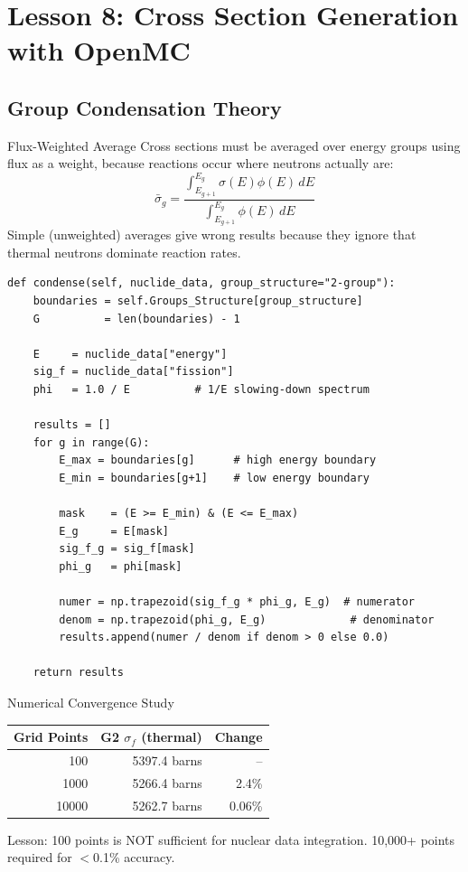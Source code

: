 \documentclass[12pt,a4paper]{article}
\begin{document}
\section{Lesson 8: Cross Section Generation with OpenMC}

\subsection{Group Condensation Theory}

\begin{physicsbox}{Flux-Weighted Average}
Cross sections must be averaged over energy groups using flux as a weight,
because reactions occur where neutrons actually are:
\begin{equation}
\bar{\sigma}_g = \frac{\displaystyle\int_{E_{g+1}}^{E_g}\sigma(E)\phi(E)\,dE}
                      {\displaystyle\int_{E_{g+1}}^{E_g}\phi(E)\,dE}
\end{equation}
Simple (unweighted) averages give wrong results because they ignore that
thermal neutrons dominate reaction rates.
\end{physicsbox}

\begin{lstlisting}[caption={Group Condensation Implementation}]
def condense(self, nuclide_data, group_structure="2-group"):
    boundaries = self.Groups_Structure[group_structure]
    G          = len(boundaries) - 1

    E     = nuclide_data["energy"]
    sig_f = nuclide_data["fission"]
    phi   = 1.0 / E          # 1/E slowing-down spectrum

    results = []
    for g in range(G):
        E_max = boundaries[g]      # high energy boundary
        E_min = boundaries[g+1]    # low energy boundary

        mask    = (E >= E_min) & (E <= E_max)
        E_g     = E[mask]
        sig_f_g = sig_f[mask]
        phi_g   = phi[mask]

        numer = np.trapezoid(sig_f_g * phi_g, E_g)  # numerator
        denom = np.trapezoid(phi_g, E_g)             # denominator
        results.append(numer / denom if denom > 0 else 0.0)

    return results
\end{lstlisting}

\begin{keybox}{Numerical Convergence Study}
\begin{center}
\begin{tabular}{rrr}
\toprule
Grid Points & G2 $\sigma_f$ (thermal) & Change \\
\midrule
100   & 5397.4 barns & -- \\
1000  & 5266.4 barns & 2.4\% \\
10000 & 5262.7 barns & 0.06\% \\
\bottomrule
\end{tabular}
\end{center}
Lesson: 100 points is NOT sufficient for nuclear data integration.
10,000+ points required for $<$0.1\% accuracy.
\end{keybox}
\end{document}
